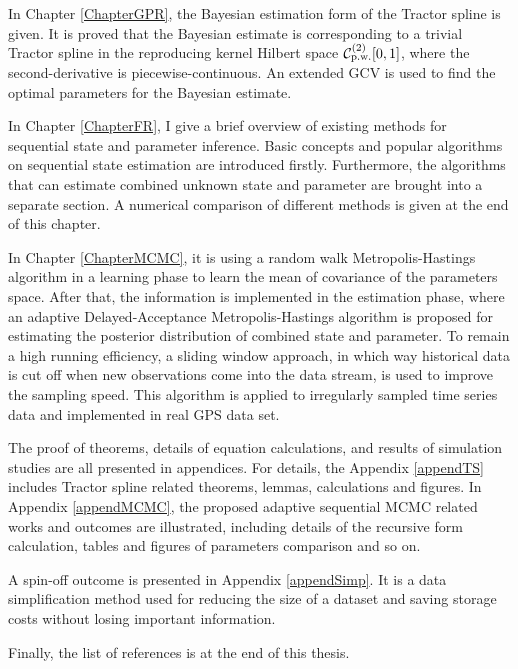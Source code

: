 In Chapter \ref{ChapterGPR}, the Bayesian estimation form of the Tractor spline is given. It is proved that the Bayesian estimate is corresponding to a trivial Tractor spline  in the reproducing kernel Hilbert space $\mathcal{C}_{\mbox{\scriptsize p.w.}}^{(2)}[0,1]$, where the second-derivative is piecewise-continuous.  An extended GCV is used to find the optimal parameters for the Bayesian estimate. 

In Chapter \ref{ChapterFR}, I give a brief overview of existing methods for sequential state and parameter inference. Basic concepts and popular algorithms on sequential state estimation are introduced firstly. Furthermore, the algorithms that can estimate combined unknown state and parameter are brought into a separate section. A numerical comparison of different methods is given at the end of this chapter. 

In Chapter \ref{ChapterMCMC}, it is using a random walk Metropolis-Hastings algorithm in a learning phase to learn the mean of covariance of the parameters space. After that, the information is implemented in the estimation phase, where an adaptive Delayed-Acceptance Metropolis-Hastings algorithm is proposed for estimating the posterior distribution of combined state and parameter. To remain a high running efficiency, a sliding window approach, in which way historical data is cut off when new observations come into the data stream, is used to improve the sampling speed. This algorithm is applied to irregularly sampled time series data and implemented in real GPS data set. 

The proof of theorems, details of equation calculations, and results of simulation studies are all presented in appendices. For details, the Appendix \ref{appendTS} includes Tractor spline related theorems, lemmas, calculations and figures. In Appendix \ref{appendMCMC}, the proposed adaptive sequential MCMC related works and outcomes are illustrated, including details of the recursive form calculation, tables and figures of parameters comparison and so on. 

A spin-off outcome is presented in Appendix \ref{appendSimp}. It is a data simplification method used for reducing the size of a dataset and saving storage costs without losing important information.

Finally, the list of references is at the end of this thesis.




